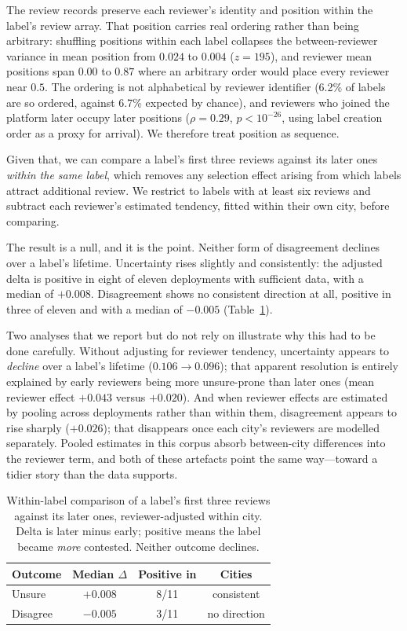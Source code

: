The review records preserve each reviewer's identity and position within the
label's review array. That position carries real ordering rather than being
arbitrary: shuffling positions within each label collapses the between-reviewer
variance in mean position from $0.024$ to $0.004$ ($z=195$), and reviewer mean
positions span $0.00$ to $0.87$ where an arbitrary order would place every
reviewer near $0.5$. The ordering is not alphabetical by reviewer identifier
(6.2\% of labels are so ordered, against 6.7\% expected by chance), and
reviewers who joined the platform later occupy later positions
($\rho = 0.29$, $p < 10^{-26}$, using label creation order as a proxy for
arrival). We therefore treat position as sequence.

Given that, we can compare a label's first three reviews against its later ones
\emph{within the same label}, which removes any selection effect arising from
which labels attract additional review. We restrict to labels with at least six
reviews and subtract each reviewer's estimated tendency, fitted within their own
city, before comparing.

The result is a null, and it is the point. Neither form of disagreement declines
over a label's lifetime. Uncertainty rises slightly and consistently: the
adjusted delta is positive in eight of eleven deployments with sufficient data,
with a median of $+0.008$. Disagreement shows no consistent direction at all,
positive in three of eleven and with a median of $-0.005$
(Table~\ref{tab:resolve}).

Two analyses that we report but do not rely on illustrate why this had to be
done carefully. Without adjusting for reviewer tendency, uncertainty appears to
\emph{decline} over a label's lifetime ($0.106 \rightarrow 0.096$); that
apparent resolution is entirely explained by early reviewers being more
unsure-prone than later ones (mean reviewer effect $+0.043$ versus $+0.020$).
And when reviewer effects are estimated by pooling across deployments rather
than within them, disagreement appears to rise sharply ($+0.026$); that
disappears once each city's reviewers are modelled separately. Pooled estimates
in this corpus absorb between-city differences into the reviewer term, and both
of these artefacts point the same way---toward a tidier story than the data
supports.

\begin{table}[tb]\centering
\caption{Within-label comparison of a label's first three reviews against its
later ones, reviewer-adjusted within city. Delta is later minus early; positive
means the label became \emph{more} contested. Neither outcome declines.}
\label{tab:resolve}
\begin{tabular}{lccc}
\hline
\textbf{Outcome} & \textbf{Median $\Delta$} & \textbf{Positive in} & \textbf{Cities} \\
\hline
Unsure   & $+0.008$ & 8/11 & consistent \\
Disagree & $-0.005$ & 3/11 & no direction \\
\hline
\end{tabular}
\end{table}


